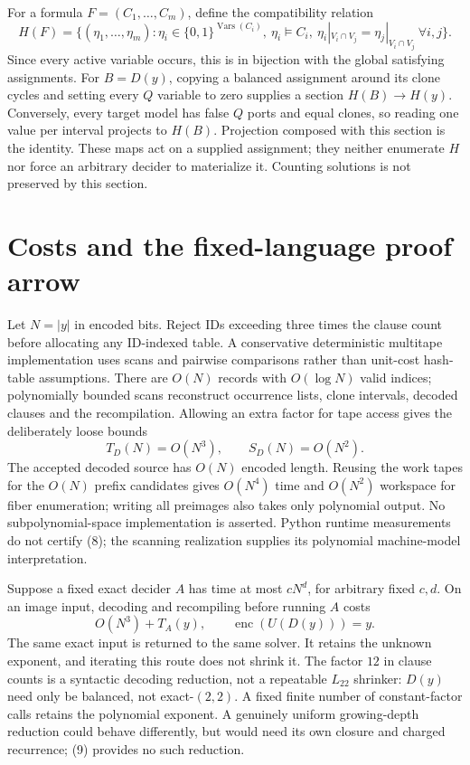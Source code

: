 \documentclass[11pt]{article}
\newcommand{\enc}{\operatorname{enc}}
\begin{document}
For a formula $F=(C_1,\ldots,C_m)$, define the compatibility relation
\[
 H(F)=\{(\eta_1,\ldots,\eta_m):\eta_i\in\{0,1\}^{\operatorname{Vars}(C_i)},
 \ \eta_i\models C_i,\ \eta_i|_{V_i\cap V_j}=\eta_j|_{V_i\cap V_j}
 \ \forall i,j\}.                                       \tag{7}
\]
Since every active variable occurs, this is in bijection with the global
satisfying assignments. For $B=D(y)$, copying a balanced assignment around
its clone cycles and setting every $Q$ variable to zero supplies a section
$H(B)\to H(y)$. Conversely, every target model has false $Q$ ports and equal
clones, so reading one value per interval projects to $H(B)$. Projection
composed with this section is the identity. These maps act on a supplied
assignment; they neither enumerate $H$ nor force an arbitrary decider to
materialize it. Counting solutions is not preserved by this section.

\section{Costs and the fixed-language proof arrow}
Let $N=|y|$ in encoded bits. Reject IDs exceeding three times the clause
count before allocating any ID-indexed table. A conservative deterministic
multitape implementation uses scans and pairwise comparisons rather than
unit-cost hash-table assumptions. There are $O(N)$ records with $O(\log N)$
valid indices; polynomially bounded scans reconstruct occurrence lists,
clone intervals, decoded clauses and the recompilation. Allowing an extra
factor for tape access gives the deliberately loose bounds
\[
 T_D(N)=O(N^3),\qquad S_D(N)=O(N^2).                       \tag{8}
\]
The accepted decoded source has $O(N)$ encoded length. Reusing the work tapes
for the $O(N)$ prefix candidates gives $O(N^4)$ time and $O(N^2)$ workspace
for fiber enumeration; writing all preimages also takes only polynomial
output. No subpolynomial-space implementation is asserted. Python runtime
measurements do not certify (8); the scanning realization supplies its
polynomial machine-model interpretation.

Suppose a fixed exact decider $A$ has time at most $cN^d$, for arbitrary fixed
$c,d$. On an image input, decoding and recompiling before running $A$ costs
\[
 O(N^3)+T_A(y),\qquad \enc(U(D(y)))=y.                    \tag{9}
\]
The same exact input is returned to the same solver. It retains the unknown
exponent, and iterating this route does not shrink it. The factor $12$ in
clause counts is a syntactic decoding reduction, not a repeatable $L_{22}$
shrinker: $D(y)$ need only be balanced, not exact-$(2,2)$. A fixed finite number of constant-factor calls retains the polynomial
exponent. A genuinely uniform growing-depth reduction could behave
differently, but would need its own closure and charged recurrence; (9)
provides no such reduction.
\end{document}
